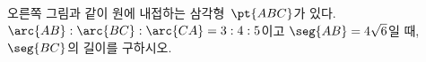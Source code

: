 \noindent\begin{minipage}[t]{0.58\linewidth}\vspace{0pt}\raggedright 오른쪽 그림과 같이 원에 내접하는 삼각형~$\pt{ABC}$가 있다. $\arc{AB}:\arc{BC}:\arc{CA}=3:4:5$이고 $\seg{AB}=4\sqrt{6}$일 때, $\seg{BC}$의 길이를 구하시오.\end{minipage}\hfill\begin{minipage}[t]{0.4\linewidth}\vspace{0pt}\centering \resizebox{\ifdim\width>\linewidth\linewidth\else\width\fi}{!}{}\end{minipage}\par
